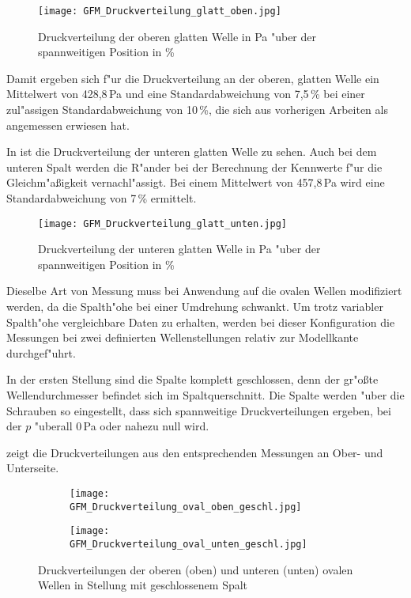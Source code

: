\begin{figure}[h]
	\centering
	\texttt{[image: GFM\_Druckverteilung\_glatt\_oben.jpg]}
	\caption{Druckverteilung der oberen glatten Welle in Pa "uber der spannweitigen Position in \%}
	\label{fig:Druckverteilung_glatt_oben}
\end{figure}

Damit ergeben sich f"ur die Druckverteilung an der oberen, glatten Welle ein Mittelwert von 428,8\,Pa und eine Standardabweichung von 7,5\,\% bei einer zul"assigen Standardabweichung von 10\,\%, die sich aus vorherigen Arbeiten als angemessen erwiesen hat.

In  ist die Druckverteilung der unteren glatten Welle zu sehen.
Auch bei dem unteren Spalt werden die R"ander bei der Berechnung der Kennwerte f"ur die Gleichm"a\ss{}igkeit vernachl"assigt.
Bei einem Mittelwert von 457,8\,Pa wird eine Standardabweichung von 7\,\% ermittelt.

\begin{figure}[h]
	\centering
	\texttt{[image: GFM\_Druckverteilung\_glatt\_unten.jpg]}
	\caption{Druckverteilung der unteren glatten Welle in Pa "uber der spannweitigen Position in \%}
	\label{fig:Druckverteilung_glatt_unten}
\end{figure}

Dieselbe Art von Messung muss bei Anwendung auf die ovalen Wellen modifiziert werden, da die Spalth"ohe bei einer Umdrehung schwankt.
Um trotz variabler Spalth"ohe vergleichbare Daten zu erhalten, werden bei dieser Konfiguration die Messungen bei zwei definierten Wellenstellungen relativ zur Modellkante durchgef"uhrt.

In der ersten Stellung sind die Spalte komplett geschlossen, denn der gr"o\ss{}te Wellendurchmesser befindet sich im Spaltquerschnitt.
Die Spalte werden "uber die Schrauben so eingestellt, dass sich spannweitige Druckverteilungen ergeben, bei der $p$ "uberall 0\,Pa oder nahezu null wird.

 zeigt die Druckverteilungen aus den entsprechenden Messungen an Ober- und Unterseite.

\begin{figure}[h]
	\centering
	\begin{subfigure}[c]{0.85\textwidth}		
		\texttt{[image: GFM\_Druckverteilung\_oval\_oben\_geschl.jpg]}
	\end{subfigure}
	\begin{subfigure}[c]{0.85\textwidth}
		\texttt{[image: GFM\_Druckverteilung\_oval\_unten\_geschl.jpg]}
	\end{subfigure}
	\caption{Druckverteilungen der oberen (oben) und unteren (unten) ovalen Wellen in Stellung mit geschlossenem Spalt}
	\label{fig:Druckverteilung_oval_geschl}
\end{figure}

